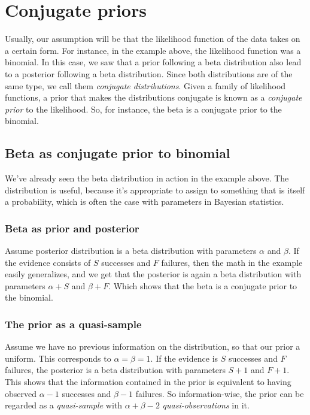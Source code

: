 \documentclass[12pt, a4paper]{article}
\begin{document}
\section{Conjugate priors}
Usually, our assumption will be that the likelihood function of the data takes on a certain form. For instance, in the example above, the likelihood function was a binomial. In this case, we saw that a prior following a beta distribution also lead to a posterior following a beta distribution. Since both distributions are of the same type, we call them \textit{conjugate distributions}. Given a family of likelihood functions, a prior that makes the distributions conjugate is known as a \textit{conjugate prior} to the likelihood. So, for instance, the beta is a conjugate prior to the binomial.

\subsection{Beta as conjugate prior to binomial}
We've already seen the beta distribution in action in the example above. The distribution is useful, because it's appropriate to assign to something that is itself a probability, which is often the case with parameters in Bayesian statistics.

\subsubsection{Beta as prior and posterior}
Assume posterior distribution is a beta distribution with parameters $\alpha$ and $\beta$. If the evidence consists of $S$ successes and $F$ failures, then the math in the example easily generalizes, and we get that the posterior is again a beta distribution with parameters $\alpha+S$ and $\beta+F$. Which shows that the beta is a conjugate prior to the binomial.

\subsubsection{The prior as a quasi-sample}
Assume we have no previous information on the distribution, so that our prior a uniform. This corresponds to $\alpha=\beta=1$. If the evidence is $S$ successes and $F$ failures, the posterior is a beta distribution with parameters $S+1$ and $F+1$. This shows that the information contained in the prior is equivalent to having observed $\alpha-1$ successes and $\beta-1$ failures. So information-wise, the prior can be regarded as a \textit{quasi-sample} with $\alpha+\beta-2$ \textit{quasi-observations} in it.
\end{document}
